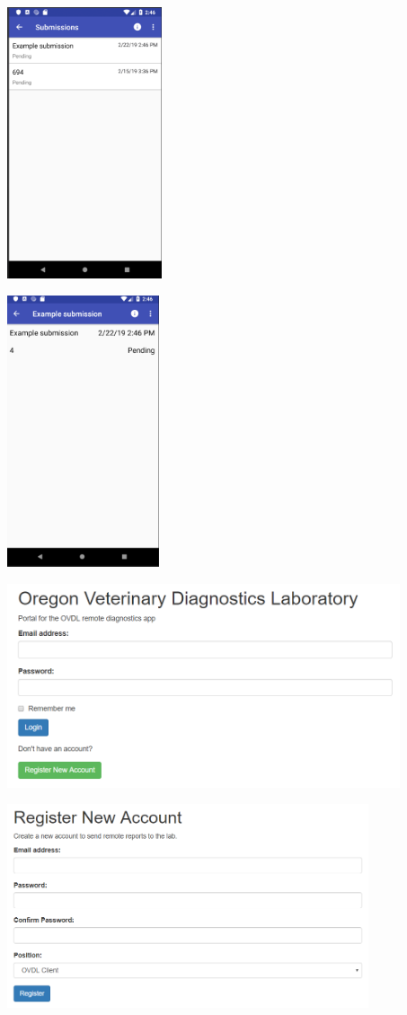 \documentclass[onecolumn, draftclsnofoot,10pt, compsoc]{IEEEtran}
\begin{document}
\begin{center}
\includegraphics[height=8cm]{Viewsubmissions.png}
\end{center}

\begin{center}
\includegraphics[height=8cm]{detail_view_submissions.png}
\end{center}

\begin{center}
    \includegraphics[height=6cm]{login_web.png}
\end{center}

\begin{center}
\includegraphics[height=6cm]{register_web.png}
\end{center}
\end{document}
